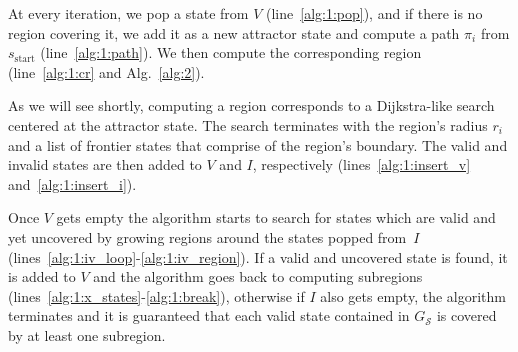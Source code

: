 \documentclass[letterpaper]{article} %
\newcommand{\calS}{\ensuremath{\mathcal{S}}\xspace}
\newcommand{\sStart}{\ensuremath{s_{\text{start}}\xspace}}
\begin{document}
At every iteration, we pop a state from $V$ (line~\ref{alg:1:pop}), and if there is no region covering it, we add it as a new attractor state and compute a path $\pi_i$ from $\sStart$ (line~\ref{alg:1:path}).
We then compute the corresponding region (line~\ref{alg:1:cr} and Alg.~\ref{alg:2}).

As we will see shortly, computing a region corresponds to a Dijkstra-like search centered at the attractor state.
The search terminates with the region's radius $r_i$ and a list of frontier states that comprise of the region's boundary.
The valid and invalid states are then added to $V$ and $I$, respectively (lines~\ref{alg:1:insert_v} and~\ref{alg:1:insert_i}).


Once $V$ gets empty the algorithm starts to search for states which are valid and yet uncovered by growing regions around the states popped from~$I$ (lines~\ref{alg:1:iv_loop}-\ref{alg:1:iv_region}). If a valid and uncovered state is found, it is added to $V$ and the algorithm goes back to computing subregions (lines~\ref{alg:1:x_states}-\ref{alg:1:break}), otherwise if $I$ also gets empty, the algorithm terminates and it is guaranteed that each valid state contained in $G_\calS$ is covered by at least one subregion.
\end{document}
